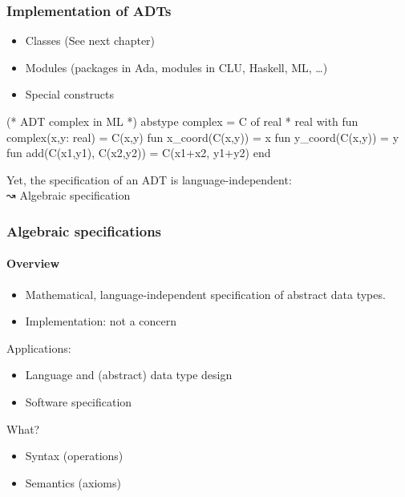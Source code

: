 \documentclass{beamer}
\begin{document}
\begin{frame}[fragile]
\frametitle{Implementation of ADTs}

\begin{itemize}
\item Classes (See next chapter)
\item Modules (packages in Ada, modules in CLU, Haskell, ML, \ldots)
\item Special constructs
\end{itemize}

\begin{cplus3}
(* ADT complex in ML *)
abstype complex = C of real * real with
    fun complex(x,y: real) = C(x,y)
    fun x_coord(C(x,y)) = x
    fun y_coord(C(x,y)) = y
    fun add(C(x1,y1), C(x2,y2)) = C(x1+x2, y1+y2)
end
\end{cplus3}


Yet, the specification of an ADT is language-independent: \\
↝ Algebraic specification 
\end{frame}

\begin{frame}[fragile]
\frametitle{Algebraic specifications}
\framesubtitle{Overview}

\begin{itemize}
\item Mathematical, language-independent specification of abstract data types.
\item Implementation: not a concern
\end{itemize}

Applications:
\begin{itemize}
\item Language and (abstract) data type design
\item Software specification
\end{itemize}

What?
\begin{itemize}
\item Syntax (operations)
\item Semantics (axioms)
\end{itemize}


\end{frame}
\end{document}
